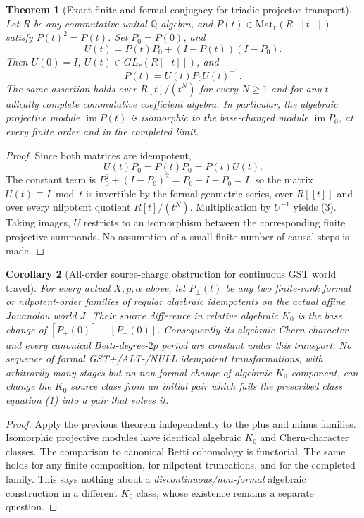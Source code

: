 \documentclass[11pt]{article}
\newtheorem{theorem}{Theorem}[section]
\newtheorem{corollary}[theorem]{Corollary}
\begin{document}
\begin{theorem}[Exact finite and formal conjugacy for triadic projector transport]
Let \(R\) be any commutative unital \(\mathbb Q\)-algebra, and \(P(t)\in\mathrm{Mat}_r(R[[t]])\) satisfy \(P(t)^2=P(t)\).
Set \(P_0=P(0)\), and
\[
 U(t)=P(t)P_0+(I-P(t))(I-P_0).
 \tag{2}
\]
Then \(U(0)=I\), \(U(t)\in GL_r(R[[t]])\), and
\[
\boxed{P(t)=U(t)P_0U(t)^{-1}.}\tag{3}
\]
The same assertion holds over \(R[t]/(t^N)\) for every \(N\ge1\) and for any \(t\)-adically complete commutative coefficient algebra. In particular, the algebraic projective module \(\operatorname{im}P(t)\) is isomorphic to the base-changed module \(\operatorname{im}P_0\), at every finite order and in the completed limit.
\end{theorem}
\begin{proof}
Since both matrices are idempotent,
\[
U(t)P_0=P(t)P_0=P(t)U(t).
\]
The constant term is \(P_0^2+(I-P_0)^2=P_0+I-P_0=I\), so the matrix \(U(t)\equiv I\bmod t\) is invertible by the formal geometric series, over \(R[[t]]\) and over every nilpotent quotient \(R[t]/(t^N)\). Multiplication by \(U^{-1}\) yields (3). Taking images, \(U\) restricts to an isomorphism between the corresponding finite projective summands. No assumption of a small finite number of causal steps is made.
\end{proof}

\begin{corollary}[All-order source-charge obstruction for continuous GST world travel]
For every actual \(X,p,\alpha\) above, let \(P_\pm(t)\) be any two finite-rank formal or nilpotent-order families of regular algebraic idempotents on the actual affine Jouanolou world \(J\). Their source difference in relative algebraic \(K_0\) is the base change of
\([P_+(0)]-[P_-(0)]\).
Consequently its algebraic Chern character and every canonical Betti-degree-\(2p\) period are constant under this transport. No sequence of formal GST+/ALT-/NULL idempotent transformations, with arbitrarily many stages but no non-formal change of algebraic \(K_0\) component, can change the \(K_0\) source class from an initial pair which fails the prescribed class equation (1) into a pair that solves it.
\end{corollary}
\begin{proof}
Apply the previous theorem independently to the plus and minus families. Isomorphic projective modules have identical algebraic \(K_0\) and Chern-character classes. The comparison to canonical Betti cohomology is functorial. The same holds for any finite composition, for nilpotent truncations, and for the completed family. This says nothing about a \emph{discontinuous/non-formal} algebraic construction in a different \(K_0\) class, whose existence remains a separate question.
\end{proof}
\end{document}

